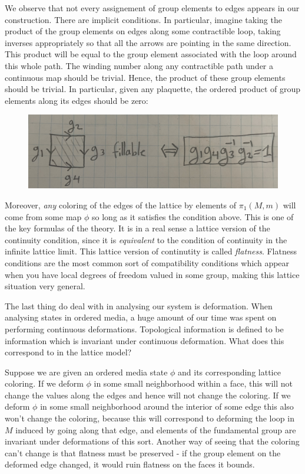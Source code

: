 \documentclass{article}
\theoremstyle{definition}
\numberwithin{figure}{section}
\begin{document}
We observe that not every assignement of group elements to edges appears in our construction. There are implicit conditions. In particular, imagine taking the product of the group elements on edges along some contractible loop, taking inverses appropriately so that all the arrows are pointing in the same direction. This product will be equal to the group element associated with the loop around this whole path. The winding number along any contractible path under a continuous map should be trivial. Hence, the product of these group elements should be trivial. In particular, given any plaquette, the ordered product of group elements along its edges should be zero:

\begin{figure}[h]
\begin{center}
\includegraphics[scale=.06]{plaquette-rule}
\end{center}
\end{figure}

Moreover, \textit{any} coloring of the edges of the lattice by elements of $\pi_1(M,m)$ will come from some map $\phi$ so long as it satisfies the condition above. This is one of the key formulas of the theory. It is in a real sense a lattice version of the continuity condition, since it is \textit{equivalent} to the condition of continuity in the infinite lattice limit. This lattice version of continutity is called \textit{flatness}. Flatness conditions are the most common sort of compatibility conditions which appear when you have local degrees of freedom valued in some group, making this lattice situation very general.

The last thing do deal with in analysing our system is deformation. When analysing states in ordered media, a huge amount of our time was spent on performing continuous deformations. Topological information is defined to be information which is invariant under continuous deformation. What does this correspond to in the lattice model?

Suppose we are given an ordered media state $\phi$ and its corresponding lattice coloring. If we deform $\phi$ in some small neighborhood within a face, this will not change the values along the edges and hence will not change the coloring. If we deform $\phi$ in some small neighborhood around the interior of some edge this also won't change the coloring, because this will correspond to deforming the loop in $M$ induced by going along that edge, and elements of the fundamental group are invariant under deformations of this sort. Another way of seeing that the coloring can't change is that flatness must be preserved - if the group element on the deformed edge changed, it would ruin flatness on the faces it bounds.
\end{document}
